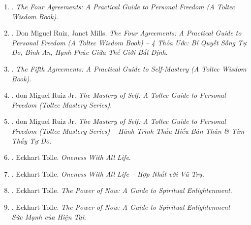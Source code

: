 \documentclass{article}
\begin{document}
\begin{enumerate}
\begin{itemize}
\begin{quotation}
			-- Bằng cách liên tục nói có với người khác, chúng ta đang vô tình nói không với chính mình.

			{\it``The best way to help the world is to help yourself 1st, not by sacrificing yourself.''}

			-- Cách tốt nhất để giúp đỡ thế giới là giúp đỡ chính mình trước tiên chứ không phải bằng cách hy sinh bản thân.
		\end{quotation}
	\end{itemize}

	\item \cite{Ruiz_4_agreements}. {\it The Four Agreements: A Practical Guide to Personal Freedom (A Toltec Wisdom Book)}.\hfill{\sf[done]}

	\item \cite{Ruiz_Mills_4_agreements_VN}. Don Miguel Ruiz, Janet Mills. {\it The Four Agreements: A Practical Guide to Personal Freedom (A Toltec Wisdom Book) -- 4 Thỏa Ước: Bí Quyết Sống Tự Do, Bình An, Hạnh Phúc Giữa Thế Giới Bất Định}.\hfill{\sf[done]}

	\item \cite{Ruiz_Ruiz_5th_agreement}. {\it The Fifth Agreements: A Practical Guide to Self-Mastery (A Toltec Wisdom Book)}.\hfill{\sf[done]}

	\item \cite{Ruiz_mastery_self}. {\sc don Miguel Ruiz Jr.} {\it The Mastery of Self: A Toltec Guide to Personal Freedom (Toltec Mastery Series)}.

	\item \cite{Ruiz_mastery_self_VN}. {\sc don Miguel Ruiz Jr.} {\it The Mastery of Self: A Toltec Guide to Personal Freedom (Toltec Mastery Series) -- Hành Trình Thấu Hiểu Bản Thân \& Tìm Thấy Tự Do}.\hfill{\sf[done]}

	\item \cite{Tolle_oneness}. {\sc Eckhart Tolle}. {\it Oneness With All Life}.

	\item \cite{Tolle_oneness_VN}. {\sc Eckhart Tolle}. {\it Oneness With All Life -- Hợp Nhất với Vũ Trụ}.\hfill{\sf[done]}

	\item \cite{Tolle_now}. {\sc Eckhart Tolle}. {\it The Power of Now: A Guide to Spiritual Enlightenment}.

	\item \cite{Tolle_now_VN}. {\sc Eckhart Tolle}. {\it The Power of Now: A Guide to Spiritual Enlightenment -- Sức Mạnh của Hiện Tại}.\hfill{\sf[done]}


\end{enumerate}
\end{document}
